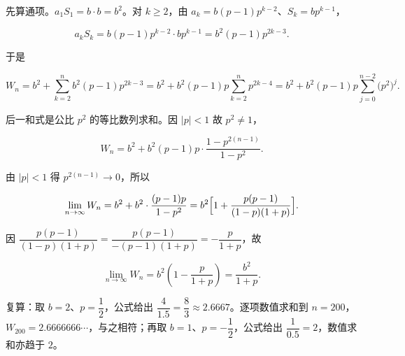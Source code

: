 \begin{answer}

先算通项。$a_1S_1=b\cdot b=b^2$。对 $k\geqslant2$，由 $a_k=b(p-1)p^{k-2}$、$S_k=bp^{k-1}$，

\nopagebreak[4]
\[
a_kS_k=b(p-1)p^{k-2}\cdot bp^{k-1}=b^2(p-1)p^{2k-3}.
\]

于是

\nopagebreak[4]
\[
W_n=b^2+\sum_{k=2}^{n}b^2(p-1)p^{2k-3}
=b^2+b^2(p-1)p\sum_{k=2}^{n}p^{2k-4}
=b^2+b^2(p-1)p\sum_{j=0}^{n-2}\bigl(p^2\bigr)^{j}.
\]

后一和式是公比 $p^2$ 的等比数列求和。因 $\lvert p\rvert<1$ 故 $p^2\neq1$，

\nopagebreak[4]
\[
W_n=b^2+b^2(p-1)p\cdot\frac{1-p^{2(n-1)}}{1-p^2}.
\]

由 $\lvert p\rvert<1$ 得 $p^{2(n-1)}\to0$，所以

\nopagebreak[4]
\[
\lim_{n\to\infty}W_n
=b^2+b^2\cdot\frac{(p-1)p}{1-p^2}
=b^2\Bigl[1+\frac{p(p-1)}{(1-p)(1+p)}\Bigr].
\]

因 $\dfrac{p(p-1)}{(1-p)(1+p)}=\dfrac{p(p-1)}{-(p-1)(1+p)}=-\dfrac{p}{1+p}$，故

\nopagebreak[4]
\[
\lim_{n\to\infty}W_n=b^2\left(1-\frac{p}{1+p}\right)=\frac{b^2}{1+p}.
\]

复算：取 $b=2$、$p=\dfrac12$，公式给出 $\dfrac{4}{1.5}=\dfrac83\approx2.6667$。逐项数值求和到 $n=200$，$W_{200}=2.6666666\cdots$，与之相符；再取 $b=1$、$p=-\dfrac12$，公式给出 $\dfrac{1}{0.5}=2$，数值求和亦趋于 $2$。



\end{answer}
